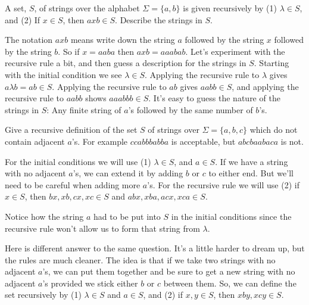 \begin{exmp} A set, $S$,  of strings over the alphabet 
$\Sigma = \{ a,b\}$
is given recursively by (1) $\lambda\in S$, and (2) If $x\in S$, then
$axb\in S$. Describe the strings in $S$.

The notation $axb$ means write down the string $a$ followed by the
string $x$ followed by the string $b$. So if $x= aaba$ then $axb=
aaabab$. Let's experiment with the recursive rule a bit, and then guess
a description for the strings in $S$. Starting with the initial condition
we see $\lambda\in S$. Applying the recursive rule to $\lambda$ gives
$a\lambda b = ab\in S$. Applying the recursive rule to $ab$ gives
$aabb\in S$, and applying the recursive rule to $aabb$ shows 
$aaabbb\in S$. It's easy to guess the nature of the strings in $S$:
Any finite string of $a$'s followed by the same number of $b$'s.
\end{exmp}
 
\begin{exmp} Give a recursive definition of the set  $S$ of strings 
over $\Sigma = \{ a,b,c\}$ which do not contain adjacent $a$'s. For example
$ccabbbabba$ is acceptable, but $abcbaabaca$ is not.

For the initial conditions we will use (1) $\lambda\in S$, and $a\in S$.
If we have a string with no adjacent $a$'s, we can extend it by adding
$b$ or $c$ to either end. But we'll  need to be careful when adding 
more $a$'s. For the recursive rule we will use
(2) if $x\in S$, then $bx,xb,cx,xc\in S$ and $abx,xba,acx,xca\in S$.

Notice how the string $a$ had to be put into $S$ in the initial conditions
since the recursive rule won't allow us to form that string from 
$\lambda$. 
\end{exmp}

Here is different answer to the same question. It's a little harder to dream up, 
but the rules are much cleaner. The idea is that if we take two strings
with no adjacent $a$'s, we can put them together and be sure to get a new string with
no adjacent $a$'s  provided we stick either $b$ or $c$ between them.
So, we can define the set recursively by (1) $\lambda\in S$ and $a\in S$, 
and (2) if $x,y\in S$, then $xby, xcy\in S$.

